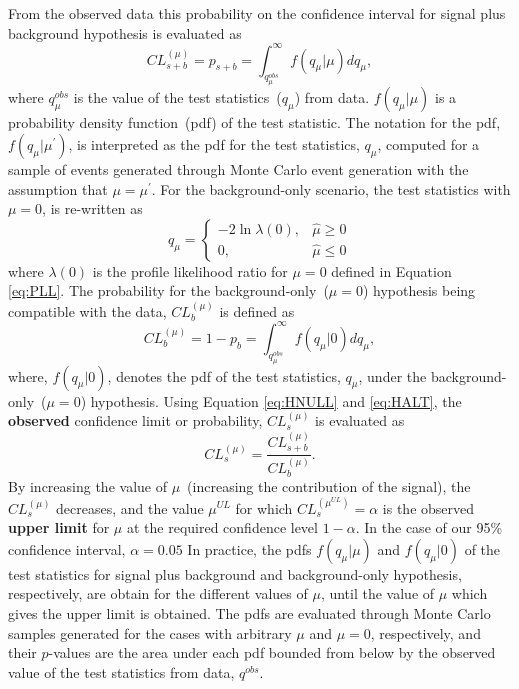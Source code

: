 \newline
From the observed data this probability on the confidence interval for signal plus background hypothesis is evaluated as 
\begin{equation}
 CL^{(\mu)}_{s+b} = p_{s+b} = \int^{\infty}_{q^{obs}_{\mu}} f(q_{\mu}|\mu) dq_{\mu},
\end{equation}
where $q^{obs}_{\mu}$ is the value of the test statistics~($q_{\mu}$) from data.
$f(q_{\mu}|\mu)$ is a probability density function~(pdf) of the test statistic. The notation for the pdf, $f(q_{\mu}|\mu^{\prime})$, is interpreted as the pdf for the test statistics, $q_{\mu}$, computed for a sample of events generated through Monte Carlo event generation with the assumption that $\mu = \mu^{\prime}$. 
\newline
For the background-only scenario, the test statistics with $\mu = 0$, is re-written as
\[\label{eq:HNULL}
 q_{\mu} = \left\lbrace  
  \begin{array}{ll}
 -2\ln \lambda(0), & \hat{\mu} \geq 0 \\
   0,              & \hat{\mu} \leq 0
  \end{array}
  \right.
\]
where $\lambda(0)$ is the profile likelihood ratio for $\mu = 0$ defined in Equation \ref{eq:PLL}.
The probability for the background-only~($\mu = 0$) hypothesis being compatible with the data, $ CL^{(\mu)}_{b}$  is defined as
\begin{equation}\label{eq:HALT}
 CL^{(\mu)}_{b} = 1 - p_{b} = \int^{\infty}_{q^{obs}_{\mu}} f(q_{\mu}|0) dq_{\mu},
\end{equation}
where, $f(q_{\mu}|0)$, denotes the pdf of the test statistics, $q_{\mu}$, under the background-only~($\mu = 0$) hypothesis.
Using Equation \ref{eq:HNULL} and \ref{eq:HALT}, the \textbf{observed} confidence limit or probability, $ CL^{(\mu)}_{s} $ is evaluated as
\begin{equation}
CL^{(\mu)}_{s} = \frac{CL^{(\mu)}_{s+b} }{ CL^{(\mu)}_{b}}.
\end{equation}
By increasing the value of $\mu$~(increasing the contribution of the signal), the $CL^{(\mu)}_{s}$ decreases, and the value $\mu^{UL}$ for which $CL^{(\mu^{UL})}_{s} = \alpha$ is the observed \textbf{upper limit} for $\mu$ at the required confidence level $1 - \alpha$. In the case of our 95\% confidence interval, $\alpha = 0.05$
\newline
In practice, the pdfs $f(q_{\mu}|\mu)$ and $f(q_{\mu}|0)$ of the test statistics for signal plus background and  background-only hypothesis, respectively, are obtain for the different values of $\mu$, until the value of $\mu$ which gives the upper limit is obtained. The pdfs are evaluated through Monte Carlo samples generated for the cases with arbitrary $\mu $ and $\mu = 0$, respectively, and their $p$-values are the area under each pdf bounded from below by the observed value of the test statistics from data, $q^{obs}$.
